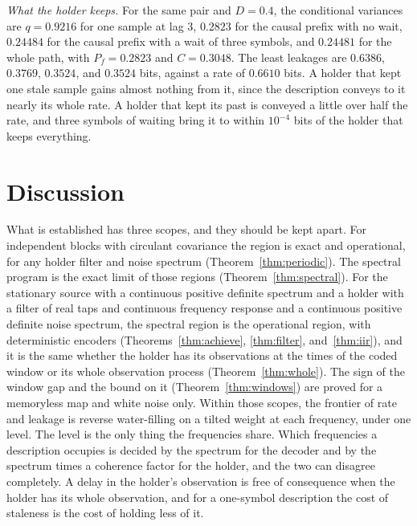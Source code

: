 \documentclass[11pt,onecolumn]{IEEEtran}
\begin{document}
\emph{What the holder keeps.} For the same pair and $D=0.4$, the
conditional variances are $q=0.9216$ for one sample at lag $3$,
$0.2823$ for the causal prefix with no wait, $0.24484$ for the causal
prefix with a wait of three symbols, and $0.24481$ for the whole path,
with $P_f=0.2823$ and $C=0.3048$. The least leakages are $0.6386$,
$0.3769$, $0.3524$, and $0.3524$ bits, against a rate of $0.6610$ bits.
A holder that kept one stale sample gains almost nothing from it, since
the description conveys to it nearly its whole rate. A holder that kept
its past is conveyed a little over half the rate, and three symbols of
waiting bring it to within $10^{-4}$ bits of the holder that keeps
everything.

\section{Discussion}
\label{sec:discussion}

What is established has three scopes, and they should be kept apart.
For independent blocks with circulant covariance the region is exact
and operational, for any holder filter and noise spectrum
(Theorem~\ref{thm:periodic}). The spectral program is
the exact limit of those regions (Theorem~\ref{thm:spectral}). For the
stationary source with a continuous positive definite spectrum and a
holder with a filter of real taps and continuous frequency response
and a continuous positive definite noise spectrum, the spectral region
is
the operational region, with deterministic encoders
(Theorems~\ref{thm:achieve}, \ref{thm:filter}, and~\ref{thm:iir}), and
it is the same whether the holder has its observations at the times of
the coded window or its whole observation process
(Theorem~\ref{thm:whole}). The
sign of the window gap and the bound on it (Theorem~\ref{thm:windows})
are proved for a memoryless map and white noise only.
Within those scopes, the
frontier of rate and leakage is reverse water-filling on a tilted
weight at each frequency, under one level. The level is the only thing
the frequencies share. Which
frequencies a description occupies is decided by the spectrum for the
decoder and by the spectrum times a coherence factor for the holder,
and the two can disagree completely. A delay in the holder's
observation is free of consequence when the holder has its whole
observation, and for a one-symbol description the cost of staleness is
the cost of holding less of it.
\end{document}
